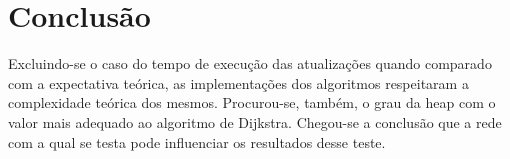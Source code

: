 \documentclass{iiufrgs}
\begin{document}
\section{Conclus\~ao}
Excluindo-se o caso do tempo de execuç\~ao das atualizaç\~oes quando comparado com a expectativa teórica, as implementaç\~oes dos 
algoritmos respeitaram a complexidade teórica dos mesmos. Procurou-se, também, o grau da heap com o valor mais adequado ao algoritmo de Dijkstra. Chegou-se
a conclus\~ao que a rede com a qual se testa pode influenciar os resultados desse teste.
\end{document}
